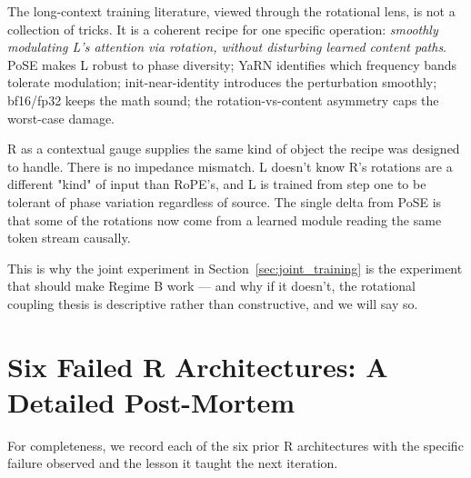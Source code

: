 \documentclass[10pt, twocolumn, a4paper]{article}
\begin{document}
The long-context training literature, viewed through the rotational lens, is not a collection of tricks. It is a coherent recipe for one specific operation: \emph{smoothly modulating L's attention via rotation, without disturbing learned content paths}. PoSE makes L robust to phase diversity; YaRN identifies which frequency bands tolerate modulation; init-near-identity introduces the perturbation smoothly; bf16/fp32 keeps the math sound; the rotation-vs-content asymmetry caps the worst-case damage.

R as a contextual gauge supplies the same kind of object the recipe was designed to handle. There is no impedance mismatch. L doesn't know R's rotations are a different "kind" of input than RoPE's, and L is trained from step one to be tolerant of phase variation regardless of source. The single delta from PoSE is that some of the rotations now come from a learned module reading the same token stream causally.

This is why the joint experiment in Section~\ref{sec:joint_training} is the experiment that should make Regime B work --- and why if it doesn't, the rotational coupling thesis is descriptive rather than constructive, and we will say so.


\section{Six Failed R Architectures: A Detailed Post-Mortem}
\label{app:failed_R}

For completeness, we record each of the six prior R architectures with the specific failure observed and the lesson it taught the next iteration.
\end{document}
